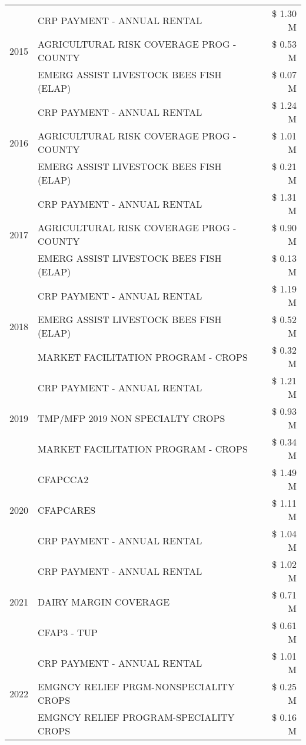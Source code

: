 \begin{tabular}{llr}
\multirow[t]{3}{*}{2015} & CRP PAYMENT - ANNUAL RENTAL & \$ 1.30 M \\
 & AGRICULTURAL RISK COVERAGE PROG - COUNTY & \$ 0.53 M \\
 & EMERG ASSIST LIVESTOCK BEES FISH (ELAP) & \$ 0.07 M \\
\cline{1-3}
\multirow[t]{3}{*}{2016} & CRP PAYMENT - ANNUAL RENTAL & \$ 1.24 M \\
 & AGRICULTURAL RISK COVERAGE PROG - COUNTY & \$ 1.01 M \\
 & EMERG ASSIST LIVESTOCK BEES FISH (ELAP) & \$ 0.21 M \\
\cline{1-3}
\multirow[t]{3}{*}{2017} & CRP PAYMENT - ANNUAL RENTAL & \$ 1.31 M \\
 & AGRICULTURAL RISK COVERAGE PROG - COUNTY & \$ 0.90 M \\
 & EMERG ASSIST LIVESTOCK BEES FISH (ELAP) & \$ 0.13 M \\
\cline{1-3}
\multirow[t]{3}{*}{2018} & CRP PAYMENT - ANNUAL RENTAL & \$ 1.19 M \\
 & EMERG ASSIST LIVESTOCK BEES FISH (ELAP) & \$ 0.52 M \\
 & MARKET FACILITATION PROGRAM - CROPS & \$ 0.32 M \\
\cline{1-3}
\multirow[t]{3}{*}{2019} & CRP PAYMENT - ANNUAL RENTAL & \$ 1.21 M \\
 & TMP/MFP 2019 NON SPECIALTY CROPS & \$ 0.93 M \\
 & MARKET FACILITATION PROGRAM - CROPS & \$ 0.34 M \\
\cline{1-3}
\multirow[t]{3}{*}{2020} & CFAPCCA2 & \$ 1.49 M \\
 & CFAPCARES & \$ 1.11 M \\
 & CRP PAYMENT - ANNUAL RENTAL & \$ 1.04 M \\
\cline{1-3}
\multirow[t]{3}{*}{2021} & CRP PAYMENT - ANNUAL RENTAL & \$ 1.02 M \\
 & DAIRY MARGIN COVERAGE & \$ 0.71 M \\
 & CFAP3 - TUP & \$ 0.61 M \\
\cline{1-3}
\multirow[t]{3}{*}{2022} & CRP PAYMENT - ANNUAL RENTAL & \$ 1.01 M \\
 & EMGNCY RELIEF PRGM-NONSPECIALITY CROPS & \$ 0.25 M \\
 & EMGNCY RELIEF PROGRAM-SPECIALITY CROPS & \$ 0.16 M \\
\cline{1-3}
\bottomrule
\end{tabular}
